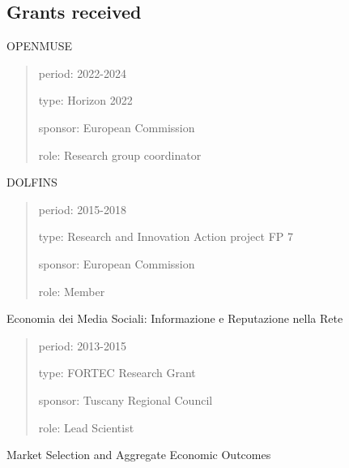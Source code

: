 \documentclass[a4paper]{article}
\newenvironment{DUfieldlist}%
    {\quote\description}
    {\enddescription\endquote}
\begin{document}
\subsection{Grants received%
  \label{grants-received}%
}

OPENMUSE

\begin{quote}
\begin{DUfieldlist}
\item[{period:}]
2022-2024

\item[{type:}]
Horizon 2022

\item[{sponsor:}]
European Commission

\item[{role:}]
Research group coordinator
\end{DUfieldlist}
\end{quote}

DOLFINS

\begin{quote}
\begin{DUfieldlist}
\item[{period:}]
2015-2018

\item[{type:}]
Research and Innovation Action project FP 7

\item[{sponsor:}]
European Commission

\item[{role:}]
Member
\end{DUfieldlist}
\end{quote}

Economia dei Media Sociali: Informazione e Reputazione nella Rete

\begin{quote}
\begin{DUfieldlist}
\item[{period:}]
2013-2015

\item[{type:}]
FORTEC Research Grant

\item[{sponsor:}]
Tuscany Regional Council

\item[{role:}]
Lead Scientist
\end{DUfieldlist}
\end{quote}

Market Selection and Aggregate Economic Outcomes
\end{document}
